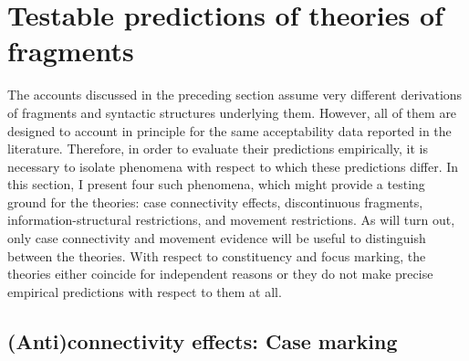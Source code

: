 \section{Testable predictions of theories of fragments}\largerpage
\label{sec:theories-predictions}

The accounts discussed in the preceding section assume very different derivations of fragments and syntactic structures underlying them. However, all of them are designed to account in principle for the same acceptability data reported in the literature. Therefore, in order to evaluate their predictions empirically, it is necessary to isolate phenomena with respect to which these predictions differ. In this section, I present four such phenomena, which might provide a testing ground for the theories: case connectivity effects, discontinuous fragments, information-structural restrictions, and movement restrictions. As will turn out, only case connectivity and movement evidence will be useful to distinguish between the theories. With respect to constituency and focus marking, the theories either coincide for independent reasons or they do not make precise empirical predictions with respect to them at all.

\subsection{(Anti)connectivity effects: Case marking} \label{sec:theories-predictions-case}

